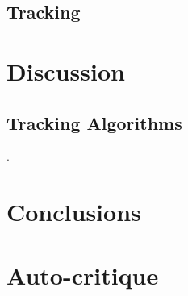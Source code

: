 \documentclass[pdftex,12pt,a4paper]{report}
\begin{document}
\section{Tracking}
\label{sec:results_tracking}

\chapter{Discussion}

\section{Tracking Algorithms}
\label{sec:discussion_tracking_algs}.

\chapter{Conclusions}

\chapter*{Auto-critique}

\printbibliography[title={References}]

\end{document}
